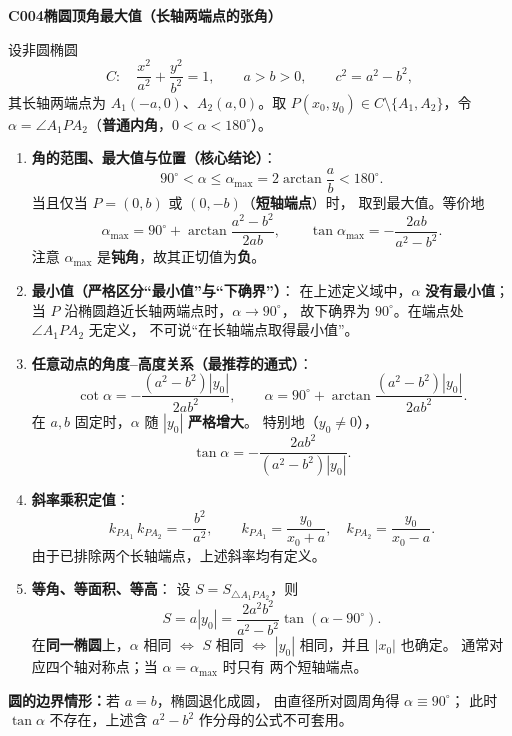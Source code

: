 \begin{statementbox}
\textbf{C004\quad 椭圆顶角最大值（长轴两端点的张角）}

设非圆椭圆
\[
C:\quad \frac{x^2}{a^2}+\frac{y^2}{b^2}=1,\qquad a>b>0,
\qquad c^2=a^2-b^2,
\]
其长轴两端点为 $A_1(-a,0)$、$A_2(a,0)$。取
$P(x_0,y_0)\in C\setminus\{A_1,A_2\}$，令
$\alpha=\angle A_1PA_2$（\textbf{普通内角}，$0<\alpha<180^\circ$）。

\begin{enumerate}
\item \textbf{角的范围、最大值与位置（核心结论）}：
\[
\boxed{90^\circ<\alpha\le\alpha_{\max}
=2\arctan\frac{a}{b}<180^\circ.}
\]
当且仅当 $P=(0,b)$ 或 $(0,-b)$（\textbf{短轴端点}）时，
取到最大值。等价地
\[
\boxed{\alpha_{\max}=90^\circ+
\arctan\frac{a^2-b^2}{2ab}},\qquad
\boxed{\tan\alpha_{\max}=-\frac{2ab}{a^2-b^2}}.
\]
注意 $\alpha_{\max}$ 是\textbf{钝角}，故其正切值为\textbf{负}。

\item \textbf{最小值（严格区分“最小值”与“下确界”）}：
在上述定义域中，$\alpha$ \textbf{没有最小值}；
当 $P$ 沿椭圆趋近长轴两端点时，$\alpha\to90^\circ$，
故下确界为 $90^\circ$。在端点处 $\angle A_1PA_2$ 无定义，
不可说“在长轴端点取得最小值”。

\item \textbf{任意动点的角度--高度关系（最推荐的通式）}：
\[
\boxed{\cot\alpha=-\frac{(a^2-b^2)|y_0|}{2ab^2}},
\qquad
\boxed{\alpha=90^\circ+
\arctan\frac{(a^2-b^2)|y_0|}{2ab^2}}.
\]
在 $a,b$ 固定时，$\alpha$ 随 $|y_0|$ \textbf{严格增大}。
特别地（$y_0\ne0$），
\[
\boxed{\tan\alpha=-\frac{2ab^2}{(a^2-b^2)|y_0|}}.
\]

\item \textbf{斜率乘积定值}：
\[
\boxed{k_{PA_1}\,k_{PA_2}=-\frac{b^2}{a^2}},\qquad
k_{PA_1}=\frac{y_0}{x_0+a},\quad
k_{PA_2}=\frac{y_0}{x_0-a}.
\]
由于已排除两个长轴端点，上述斜率均有定义。

\item \textbf{等角、等面积、等高}：
设 $S=S_{\triangle A_1PA_2}$，则
\[
\boxed{S=a|y_0|=\frac{2a^2b^2}{a^2-b^2}
\tan(\alpha-90^\circ)}.
\]
在\textbf{同一椭圆}上，$\alpha$ 相同 $\Longleftrightarrow$
$S$ 相同 $\Longleftrightarrow$ $|y_0|$ 相同，并且 $|x_0|$ 也确定。
通常对应四个轴对称点；当 $\alpha=\alpha_{\max}$ 时只有
两个短轴端点。
\end{enumerate}

\textbf{圆的边界情形：}若 $a=b$，椭圆退化成圆，
由直径所对圆周角得 $\alpha\equiv90^\circ$；
此时 $\tan\alpha$ 不存在，上述含 $a^2-b^2$ 作分母的公式不可套用。
\end{statementbox}
